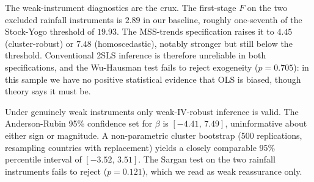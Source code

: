 \documentclass[11pt,a4paper]{article}
\begin{document}
The weak-instrument diagnostics are the crux. The first-stage $F$ on
the two excluded rainfall instruments is $2.89$ in our baseline,
roughly one-seventh of the Stock-Yogo threshold of $19.93$. The
MSS-trends specification raises it to $4.45$ (cluster-robust) or $7.48$
(homoscedastic), notably stronger but still below the threshold.
Conventional 2SLS inference is therefore unreliable in both
specifications, and the Wu-Hausman test fails to reject exogeneity
($p = 0.705$): in this sample we have no positive statistical evidence
that OLS is biased, though theory says it must be.

Under genuinely weak instruments only weak-IV-robust inference is
valid. The Anderson-Rubin 95\% confidence set for $\beta$ is
$[-4.41,\,7.49]$, uninformative about either sign or magnitude. A
non-parametric cluster bootstrap (500 replications, resampling
countries with replacement) yields a closely comparable 95\% percentile
interval of $[-3.52,\,3.51]$. The Sargan test on the two rainfall
instruments fails to reject ($p = 0.121$), which we read as weak
reassurance only.
\end{document}
